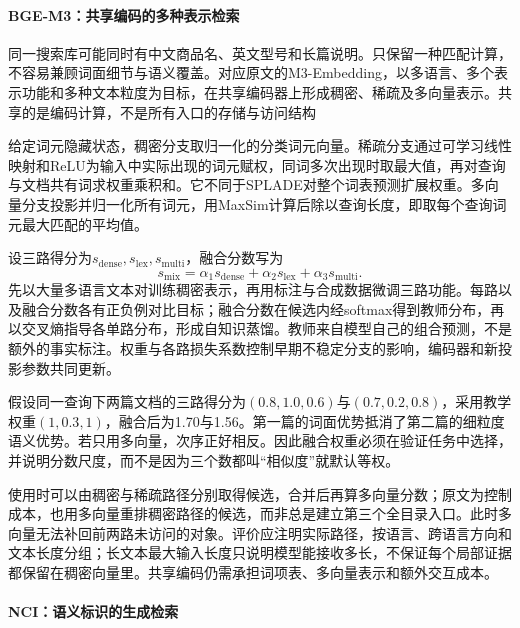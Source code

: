 \Needspace{100mm}
\paragraph{BGE-M3：共享编码的多种表示检索}
\label{sec:rs-search-bge-m3}

同一搜索库可能同时有中文商品名、英文型号和长篇说明。只保留一种匹配计算，不容易兼顾词面细节与语义覆盖。对应原文的M3-Embedding，以多语言、多个表示功能和多种文本粒度为目标，在共享编码器上形成稠密、稀疏及多向量表示。共享的是编码计算，不是所有入口的存储与访问结构

给定词元隐藏状态，稠密分支取归一化的分类词元向量。稀疏分支通过可学习线性映射和ReLU为输入中实际出现的词元赋权，同词多次出现时取最大值，再对查询与文档共有词求权重乘积和。它不同于SPLADE对整个词表预测扩展权重。多向量分支投影并归一化所有词元，用MaxSim计算后除以查询长度，即取每个查询词元最大匹配的平均值。

设三路得分为$s_{\mathrm{dense}},s_{\mathrm{lex}},s_{\mathrm{multi}}$，融合分数写为
\begin{equation}
 s_{\mathrm{mix}}=\alpha_1s_{\mathrm{dense}}+
                  \alpha_2s_{\mathrm{lex}}+\alpha_3s_{\mathrm{multi}} .
 \label{eq:rs-search-bge-m3-fusion}
\end{equation}
先以大量多语言文本对训练稠密表示，再用标注与合成数据微调三路功能。每路以及融合分数各有正负例对比目标；融合分数在候选内经softmax得到教师分布，再以交叉熵指导各单路分布，形成自知识蒸馏。教师来自模型自己的组合预测，不是额外的事实标注。权重与各路损失系数控制早期不稳定分支的影响，编码器和新投影参数共同更新。

假设同一查询下两篇文档的三路得分为$(0.8,1.0,0.6)$与$(0.7,0.2,0.8)$，采用教学权重$(1,0.3,1)$，融合后为1.70与1.56。第一篇的词面优势抵消了第二篇的细粒度语义优势。若只用多向量，次序正好相反。因此融合权重必须在验证任务中选择，并说明分数尺度，而不是因为三个数都叫“相似度”就默认等权。

使用时可以由稠密与稀疏路径分别取得候选，合并后再算多向量分数；原文为控制成本，也用多向量重排稠密路径的候选，而非总是建立第三个全目录入口。此时多向量无法补回前两路未访问的对象。评价应注明实际路径，按语言、跨语言方向和文本长度分组；长文本最大输入长度只说明模型能接收多长，不保证每个局部证据都保留在稠密向量里。共享编码仍需承担词项表、多向量表示和额外交互成本。

\Needspace{155mm}
\paragraph{NCI：语义标识的生成检索}
\label{sec:rs-search-nci}

